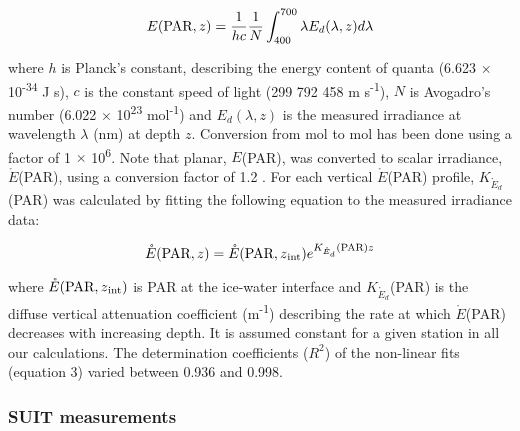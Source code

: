 \documentclass[draft]{agujournal2018}
\newcommand{\kdparscalar}{\ensuremath{K_{\mathring{E}_d}}(\textnormal{PAR})}
\newcommand{\epar}{\ensuremath{E}(\textnormal{PAR})}
\newcommand{\eparz}{\ensuremath{E(\textnormal{PAR}, z)}}
\newcommand{\edlambdaz}{\ensuremath{{E_d(\lambda, z)}}}
\newcommand{\eparscalar}{\ensuremath{\mathring{E}}(\textnormal{PAR})}
\newcommand{\eparzscalar}{\ensuremath{\mathring{E}(\textnormal{PAR}, z)}}
\newcommand{\eparzintscalar}{\ensuremath{\mathring{E}(\textnormal{PAR}, z\textsubscript{int})}}
\newcommand{\mminus}{m\textsuperscript{-1}}
\begin{document}
\begin{linenomath*}
    \begin{equation}
		\eparz{} = \frac{1}{hc} \frac{1}{N} \int_{400}^{700} \lambda E_d(\lambda, z)d\lambda
	\end{equation}
\end{linenomath*}

\noindent where $h$ is Planck's constant, describing the energy content of quanta (6.623 $\times$ 10\textsuperscript{-34} J s), $c$ is the constant speed of light (299 792 458 m s\textsuperscript{-1}), $N$ is Avogadro's number (6.022 $\times$ 10\textsuperscript{23} mol\textsuperscript{-1}) and \edlambdaz{} is the measured irradiance at wavelength $\lambda$ (nm) at depth $z$. Conversion from mol to \textmu mol has been done using a factor of 1 $\times$ 10\textsuperscript{6}. Note that planar, \epar{}, was converted to scalar irradiance, \eparscalar{}, using a conversion factor of 1.2 \citep{Toole2003}. For each vertical \eparscalar{} profile, \kdparscalar{} was calculated by fitting the following equation to the measured irradiance data:

\begin{linenomath*}
    \begin{equation}
		\eparzscalar{} = \eparzintscalar{} e^{\kdparscalar{}z}
	\end{equation}
\end{linenomath*}

where \eparzintscalar{} is PAR at the ice-water interface and \kdparscalar{} is the diffuse vertical attenuation coefficient (\mminus{}) describing the rate at which \eparscalar{} decreases with increasing depth. It is assumed constant for a given station in all our calculations. The determination coefficients ($R^2$) of the non-linear fits (equation 3) varied between 0.936 and 0.998.

\subsubsection{SUIT measurements}
\end{document}
